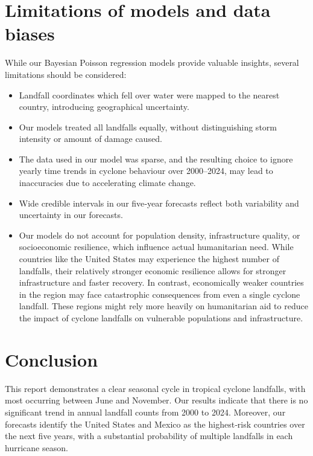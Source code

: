 \documentclass[
]{article}
\providecommand{\tightlist}{%
  \setlength{\itemsep}{0pt}\setlength{\parskip}{0pt}}
\begin{document}
\section{Limitations of models and data biases}\label{limitations-of-models-and-data-biases}

While our Bayesian Poisson regression models provide valuable insights, several limitations should be considered:

\begin{itemize}
\tightlist
\item
  Landfall coordinates which fell over water were mapped to the nearest country, introducing geographical uncertainty.
\item
  Our models treated all landfalls equally, without distinguishing storm intensity or amount of damage caused.
\item
  The data used in our model was sparse, and the resulting choice to ignore yearly time trends in cyclone behaviour over 2000--2024, may lead to inaccuracies due to accelerating climate change.
\item
  Wide credible intervals in our five‑year forecasts reflect both variability and uncertainty in our forecasts.
\item
  Our models do not account for population density, infrastructure quality, or socioeconomic resilience, which influence actual humanitarian need. While countries like the United States may experience the highest number of landfalls, their relatively stronger economic resilience allows for stronger infrastructure and faster recovery. In contrast, economically weaker countries in the region may face catastrophic consequences from even a single cyclone landfall. These regions might rely more heavily on humanitarian aid to reduce the impact of cyclone landfalls on vulnerable populations and infrastructure.
\end{itemize}

\section{Conclusion}\label{conclusion}

This report demonstrates a clear seasonal cycle in tropical cyclone landfalls, with most occurring between June and November. Our results indicate that there is no significant trend in annual landfall counts from 2000 to 2024. Moreover, our forecasts identify the United States and Mexico as the highest‑risk countries over the next five years, with a substantial probability of multiple landfalls in each hurricane season.
\end{document}

